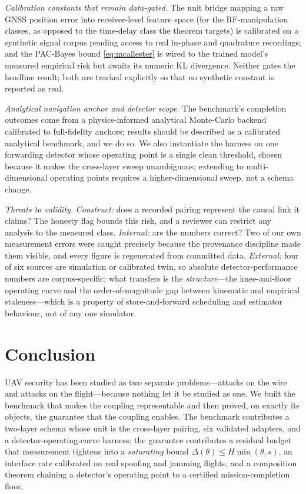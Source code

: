 \emph{Calibration constants that remain data-gated.} The unit bridge mapping a
raw GNSS position error into receiver-level feature space (for the
RF-manipulation classes, as opposed to the time-delay class the theorem targets)
is calibrated on a synthetic signal corpus pending access to real in-phase and
quadrature recordings; and the PAC-Bayes bound \eqref{eq:mcallester} is wired to
the trained model's measured empirical risk but awaits its numeric KL
divergence. Neither gates the headline result; both are tracked explicitly so
that no synthetic constant is reported as real.

\emph{Analytical navigation anchor and detector scope.} The benchmark's
completion outcomes come from a physics-informed analytical Monte-Carlo backend
calibrated to full-fidelity anchors; results should be described as a calibrated
analytical benchmark, and we do so. We also instantiate the harness on one
forwarding detector whose operating point is a single clean threshold, chosen
because it makes the cross-layer sweep unambiguous; extending to
multi-dimensional operating points requires a higher-dimensional sweep, not a
schema change.

\emph{Threats to validity.} \emph{Construct:} does a recorded pairing represent
the causal link it claims? The honesty flag bounds this risk, and a reviewer can
restrict any analysis to the measured class. \emph{Internal:} are the numbers
correct? Two of our own measurement errors were caught precisely because the
provenance discipline made them visible, and every figure is regenerated from
committed data. \emph{External:} four of six sources are simulation or
calibrated twin, so absolute detector-performance numbers are corpus-specific;
what transfers is the \emph{structure}---the knee-and-floor operating curve and
the order-of-magnitude gap between kinematic and empirical staleness---which is a
property of store-and-forward scheduling and estimator behaviour, not of any one
simulator.

\section{Conclusion}
\label{sec:conclusion}
UAV security has been studied as two separate problems---attacks on the wire and
attacks on the flight---because nothing let it be studied as one. We built the
benchmark that makes the coupling representable and then proved, on exactly its
objects, the guarantee that the coupling enables. The benchmark contributes a
two-layer schema whose unit is the cross-layer pairing, six validated adapters,
and a detector-operating-curve harness; the guarantee contributes a residual
budget that measurement tightens into a \emph{saturating} bound
$\Delta(\theta)\le H\min(\theta,s)$, an interface rate calibrated on real
spoofing and jamming flights, and a composition theorem chaining a detector's
operating point to a certified mission-completion floor.

